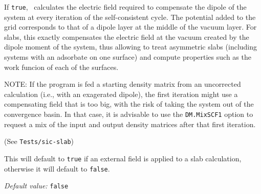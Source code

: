 \begin{description}
If \texttt{true}, \siesta\ calculates the electric field required to
compensate the dipole of the system at every iteration of the
self-consistent cycle. The potential added to the grid corresponds to
that of a dipole layer at the middle of the vacuum layer. For slabs,
this exactly compensates the electric field at the vacuum created by
the dipole moment of the system, thus allowing to treat asymmetric
slabs (including systems with an adsorbate on one surface) and compute
properties such as the work funcion of each of the surfaces.

NOTE: If the program is fed a starting density matrix from an
uncorrected calculation (i.e., with an exagerated dipole), the first
iteration might use a compensating field that is too big, with the
risk of taking the system out of the convergence basin. In that case,
it is advisable to use the \texttt{DM.MixSCF1} option to request a mix of the
input and output density matrices after that first iteration.

(See \texttt{Tests/sic-slab})

This will default to \texttt{true} if an external field is applied to a slab 
calculation, otherwise it will default to \texttt{false}.

\textit{Default value:} \texttt{false}

\end{description}


